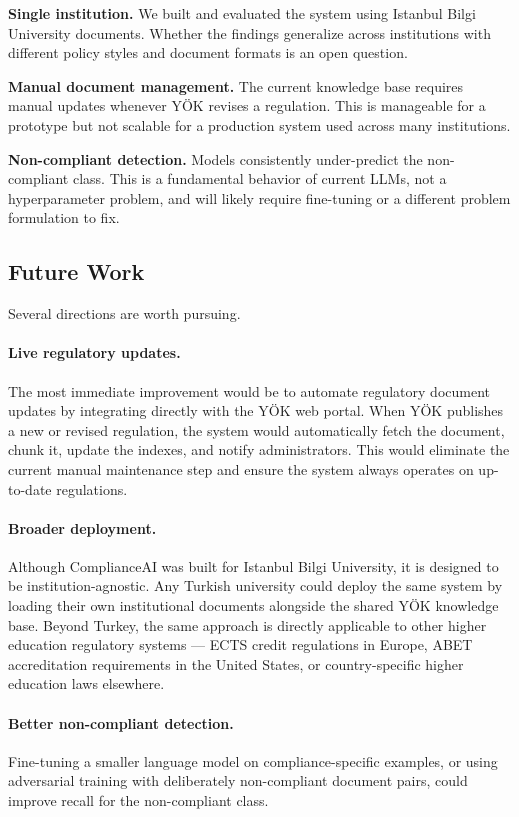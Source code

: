 \textbf{Single institution.}
We built and evaluated the system using Istanbul Bilgi University documents.
Whether the findings generalize across institutions with different policy
styles and document formats is an open question.

\textbf{Manual document management.}
The current knowledge base requires manual updates whenever YÖK revises
a regulation. This is manageable for a prototype but not scalable
for a production system used across many institutions.

\textbf{Non-compliant detection.}
Models consistently under-predict the non-compliant class.
This is a fundamental behavior of current LLMs, not a hyperparameter problem,
and will likely require fine-tuning or a different problem formulation to fix.

\subsection{Future Work}

Several directions are worth pursuing.

\paragraph{Live regulatory updates.}
The most immediate improvement would be to automate regulatory document
updates by integrating directly with the YÖK web portal.
When YÖK publishes a new or revised regulation, the system would
automatically fetch the document, chunk it, update the indexes, and notify
administrators. This would eliminate the current manual maintenance step
and ensure the system always operates on up-to-date regulations.

\paragraph{Broader deployment.}
Although ComplianceAI was built for Istanbul Bilgi University, it is designed
to be institution-agnostic. Any Turkish university could deploy the same system
by loading their own institutional documents alongside the shared YÖK knowledge
base. Beyond Turkey, the same approach is directly applicable to other
higher education regulatory systems --- ECTS credit regulations in Europe,
ABET accreditation requirements in the United States, or country-specific
higher education laws elsewhere.

\paragraph{Better non-compliant detection.}
Fine-tuning a smaller language model on compliance-specific examples, or
using adversarial training with deliberately non-compliant document pairs,
could improve recall for the non-compliant class.

